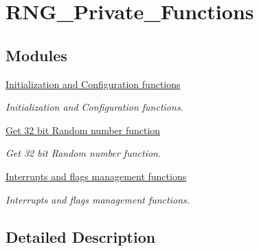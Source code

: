 \hypertarget{group___r_n_g___private___functions}{}\section{R\+N\+G\+\_\+\+Private\+\_\+\+Functions}
\label{group___r_n_g___private___functions}
\subsection*{Modules}
\begin{DoxyCompactItemize}
\item 
\hyperlink{group___r_n_g___group1}{Initialization and Configuration functions}
\begin{DoxyCompactList}\small\item\em Initialization and Configuration functions. \end{DoxyCompactList}\item 
\hyperlink{group___r_n_g___group2}{Get 32 bit Random number function}
\begin{DoxyCompactList}\small\item\em Get 32 bit Random number function. \end{DoxyCompactList}\item 
\hyperlink{group___r_n_g___group3}{Interrupts and flags management functions}
\begin{DoxyCompactList}\small\item\em Interrupts and flags management functions. \end{DoxyCompactList}\end{DoxyCompactItemize}


\subsection{Detailed Description}
